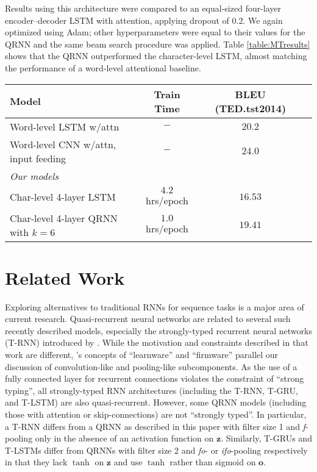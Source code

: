 \documentclass{article} \usepackage{iclr2017_conference,times}
\begin{document}
Results using this architecture were compared to an equal-sized four-layer encoder--decoder LSTM with attention, applying dropout of 0.2. We again optimized using Adam; other hyperparameters were equal to their values for the QRNN and the same beam search procedure was applied. Table \ref{table:MTresults} shows that the QRNN outperformed the character-level LSTM, almost matching the performance of a word-level attentional baseline.
\begin{table*}
\centering
\small
\begin{tabular}{l|ccc}
\toprule
\bf Model & \bf Train Time & \bf BLEU (TED.tst2014) \\
\midrule
Word-level LSTM w/attn \citep{Ranzato2016} & $-$ & $20.2$ \\
Word-level CNN w/attn, input feeding \citep{Wiseman2016} & $-$ & $24.0$ \\
\midrule
{\it Our models}\\
Char-level 4-layer LSTM & $4.2$ hrs/epoch & $16.53$ \\
Char-level 4-layer QRNN with $k=6$ & $1.0$ hrs/epoch & $19.41$ \\
\bottomrule
\end{tabular}
\caption{
Translation performance, measured by BLEU, and train speed in hours per epoch, for the IWSLT German-English spoken language translation task. All models were trained on in-domain data only, and use negative log-likelihood as the training criterion.
Our models were trained for 10 epochs. The QRNN model uses $k=2$ for all layers other than the first encoder layer.
}
\label{table:MTresults}
\end{table*}

\section{Related Work}

Exploring alternatives to traditional RNNs for sequence tasks is a major area of current research. Quasi-recurrent neural networks are related to several such recently described models, especially the strongly-typed recurrent neural networks (T-RNN) introduced by \cite{Balduzzi2016}. While the motivation and constraints described in that work are different, \cite{Balduzzi2016}'s concepts of ``learnware'' and ``firmware'' parallel our discussion of convolution-like and pooling-like subcomponents. As the use of a fully connected layer for recurrent connections violates the constraint of ``strong typing'', all strongly-typed RNN architectures (including the T-RNN, T-GRU, and T-LSTM) are also quasi-recurrent. However, some QRNN models (including those with attention or skip-connections) are not ``strongly typed''. In particular, a T-RNN differs from a QRNN as described in this paper with filter size 1 and \emph{f}-pooling only in the absence of an activation function on $\mathbf{z}$. Similarly, T-GRUs and T-LSTMs differ from QRNNs with filter size 2 and \emph{fo}- or \emph{ifo}-pooling respectively in that they lack $\tanh$ on $\mathbf{z}$ and use $\tanh$ rather than sigmoid on $\mathbf{o}$.
\end{document}
